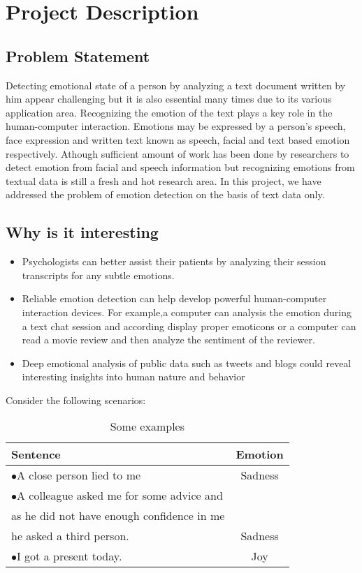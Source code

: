 \section{Project Description}
\subsection{Problem Statement}
Detecting emotional state of a person by analyzing a text document
written by him appear challenging but it is also essential many times due to its various application area. Recognizing the emotion of the text plays a key role in 
the human-computer interaction. Emotions may be expressed by a person's speech, 
face  expression  and  written  text  known  as  speech,  facial  and  text  based  emotion 
respectively. Athough sufficient amount of work has been done by researchers to detect emotion from facial and 
speech information but recognizing  emotions  from  textual  data  is still a fresh and hot 
research area. In this project, we have addressed the problem of emotion detection on the basis of text data only.
\subsection{Why is it interesting}
\begin{itemize}
\item Psychologists can better assist their patients by analyzing their session transcripts for any subtle emotions.
\item Reliable emotion detection can help develop powerful human-computer interaction devices. For example,a computer can analysis the emotion during a text chat session and according display proper emoticons or a computer can read a movie review and then analyze the sentiment of the reviewer.
\item Deep  emotional  analysis  of  public  data such  as  tweets  and  blogs  could  reveal  interesting  insights into human nature and behavior
\end{itemize}

Consider the following scenarios:

\begin{table}[ht!]
\centering
\label{tab-some-examples}
\begin{tabular}{l|c}
\textbf{Sentence} & \textbf{Emotion} \\
\hline
$\bullet$A close person lied to me & Sadness \\
$\bullet$A colleague asked me for some advice and & \\
as he did not have enough confidence in me & \\
he asked a third person. & Sadness \\
$\bullet$I got a present today. & Joy
\end{tabular}
\caption{Some examples}
\end{table}

